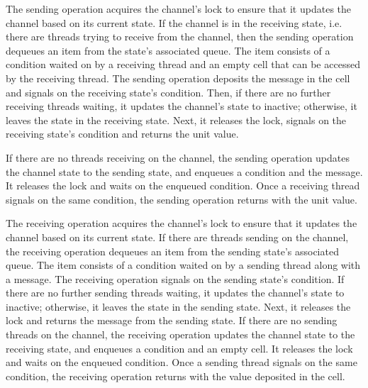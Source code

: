 \documentclass[10pt]{article}
\begin{document}
The sending operation acquires the channel's lock to
ensure that it updates the channel based on
its current state.  If the channel is in the receiving state,
i.e. there are threads trying to receive from the channel,
then the sending operation dequeues an item from the state's associated queue.
The item consists of a condition waited on by a receiving thread and an empty cell
that can be accessed by the receiving thread.
The sending operation deposits the message in the cell and signals on the receiving state's condition.
Then, if there are no further receiving threads waiting, it updates the channel's state to inactive; otherwise,
it leaves the state in the receiving state.
Next, it releases the lock, signals on the receiving state's condition and returns the unit value.

If there are no threads receiving on the
channel, the sending operation updates the channel state to the sending state,
and enqueues a condition and the message.
It releases the lock and waits on the enqueued condition.
Once a receiving thread signals on the same condition,
the sending operation returns with the unit value.

The receiving operation acquires the channel's lock
to ensure that it updates the channel based on
its current state.  If there are threads
sending on the channel, the receiving 
operation dequeues an item from the sending state's associated queue.  The item consists of a condition
waited on by a sending thread along with a message.
The receiving operation signals on the sending state's condition.
If there are no further sending threads waiting, it updates the channel's state to inactive; otherwise,
it leaves the state in the sending state.
Next, it releases the lock and returns the message from the sending state.
If there are no sending threads on the
channel, the receiving operation updates the channel state to the receiving state, and enqueues
a condition and an empty cell.  It releases the lock and waits on
the enqueued condition.  Once a sending thread signals on the same condition,
the receiving operation returns with the value deposited in the cell.
\end{document}
